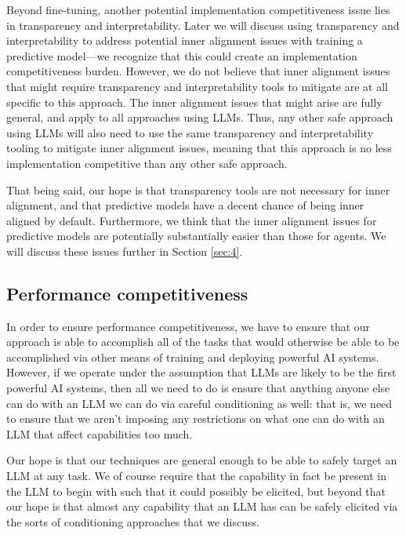 \documentclass[
  twocolumn,
  natbib,
]{miri-tech-article}
\begin{document}
Beyond fine-tuning, another potential implementation competitiveness issue lies in transparency and interpretability. Later we will discuss using transparency and interpretability to address potential inner alignment issues with training a predictive model---we recognize that this could create an implementation competitiveness burden. However, we do not believe that inner alignment issues that might require transparency and interpretability tools to mitigate are at all specific to this approach. The inner alignment issues that might arise are fully general, and apply to all approaches using LLMs. Thus, any other safe approach using LLMs will also need to use the same transparency and interpretability tooling to mitigate inner alignment issues, meaning that this approach is no less implementation competitive than any other safe approach.

That being said, our hope is that transparency tools are not necessary for inner alignment, and that predictive models have a decent chance of being inner aligned by default. Furthermore, we think that the inner alignment issues for predictive models are potentially substantially easier than those for agents. We will discuss these issues further in Section \ref{sec:4}.


\subsection{Performance competitiveness}

In order to ensure performance competitiveness, we have to ensure that our approach is able to accomplish all of the tasks that would otherwise be able to be accomplished via other means of training and deploying powerful AI systems. However, if we operate under the assumption that LLMs are likely to be the first powerful AI systems, then all we need to do is ensure that anything anyone else can do with an LLM we can do via careful conditioning as well: that is, we need to ensure that we aren't imposing any restrictions on what one can do with an LLM that affect capabilities too much.

Our hope is that our techniques are general enough to be able to safely target an LLM at any task. We of course require that the capability in fact be present in the LLM to begin with such that it could possibly be elicited, but beyond that our hope is that almost any capability that an LLM has can be safely elicited via the sorts of conditioning approaches that we discuss.
\end{document}
